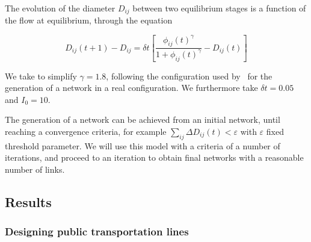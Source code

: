\documentclass[runningheads,a4paper]{llncs2e/llncs}
\begin{document}
The evolution of the diameter $D_{ij}$ between two equilibrium stages is a function of the flow at equilibrium, through the equation


\[
D_{ij} (t+1) - D_{ij} = \delta t \left[ \frac{\phi_{ij}(t)^\gamma}{1 + \phi_{ij}(t)^\gamma} - D_{ij}(t)\right]
\]

We take to simplify $\gamma = 1.8$, following the configuration used by~\cite{tero2010rules} for the generation of a network in a real configuration. We furthermore take $\delta t = 0.05$ and $I_0 = 10$.


The generation of a network can be achieved from an initial network, until reaching a convergence criteria, for example $\sum_{ij} \Delta D_{ij} (t) < \varepsilon$ with $\varepsilon$ fixed threshold parameter. We will use this model with a criteria of a number of iterations, and proceed to an iteration to obtain final networks with a reasonable number of links.




\subsection{Results}


\subsubsection{Designing public transportation lines}
\end{document}

